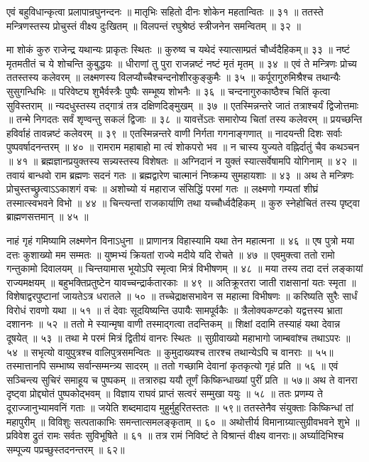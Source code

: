 एवं बहुविधान्कृत्वा प्रलापान्रघुनन्दनः ॥
मातृभिः सहितो दीनः शोकेन महतान्वितः ॥ ३१ ॥
ततस्ते मन्त्रिणस्तस्य प्रोचुस्तं वीक्ष्य दुःखितम् ॥
विलपन्तं रघुश्रेष्ठं स्त्रीजनेन समन्वितम् ॥ ३२ ॥

मा शोकं कुरु राजेन्द्र यथान्यः प्राकृतः स्थितः ॥
कुरुष्व च यथेदं स्यात्साम्प्रतं चौर्ध्वदैहिकम्॥ ३३ ॥
नष्टं मृतमतीतं च ये शोचन्ति कुबुद्धयः ॥
धीराणां तु पुरा राजन्नष्टं नष्टं मृतं मृतम् ॥ ३४ ॥
एवं ते मन्त्रिणः प्रोच्य ततस्तस्य कलेवरम् ॥
लक्ष्मणस्य विलप्यौच्चैश्चन्दनोशीरकुङ्कुमैः ॥ ३५ ॥
कर्पूरागुरुमिश्रैश्च तथान्यैः सुसुगन्धिभिः ॥
परिवेष्ट्य शुभैर्वस्त्रैः पुष्पैः सम्भूष्य शोभनैः ॥ ३६ ॥
चन्दनागुरुकाष्ठैश्च चितिं कृत्वा सुविस्तराम् ॥
न्यदधुस्तस्य तद्गात्रं तत्र दक्षिणदिङ्मुखम् ॥ ३७ ॥
एतस्मिन्नन्तरे जातं तत्राश्चर्यं द्विजोत्तमाः ॥
तन्मे निगदतः सर्वं शृण्वन्तु सकलं द्विजाः ॥ ३८ ॥
यावत्तेंऽतः समारोप्य चितां तस्य कलेवरम् ॥
प्रयच्छन्ति हविर्वाहं तावन्नष्टं कलेवरम् ॥ ३९ ॥
एतस्मिन्नन्तरे वाणी निर्गता गगनाङ्गणात् ॥
नादयन्ती दिशः सर्वाः पुष्पवर्षादनन्तरम् ॥ ४० ॥
रामराम महाबाहो मा त्वं शोकपरो भव ॥
न चास्य युज्यते वह्निर्दातुं चैव कथञ्चन ॥ ४१ ॥
ब्रह्मज्ञानप्रयुक्तस्य सन्न्यस्तस्य विशेषतः ॥
अग्निदानं न युक्तं स्यात्सर्वेषामपि योगिनाम् ॥ ४२ ॥
तवायं बान्धवो राम ब्रह्मणः सदनं गतः ॥
ब्रह्मद्वारेण चात्मानं निष्क्रम्य सुमहायशाः ॥ ४३ ॥
अथ ते मन्त्रिणः प्रोचुस्तच्छ्रुत्वाऽऽकाशगं वचः ॥
अशोच्यो यं महाराज संसिद्धिं परमां गतः ॥
लक्ष्मणो गम्यतां शीघ्रं तस्मात्स्वभवने विभो ॥ ४४ ॥
चिन्त्यन्तां राजकार्याणि तथा यच्चौर्ध्वदैहिकम् ॥
कुरु स्नेहोचितं तस्य पृष्ट्वा ब्राह्मणसत्तमान् ॥ ४५ ॥

नाहं गृहं गमिष्यामि लक्ष्मणेन विनाऽधुना ॥
प्राणानत्र विहास्यामि यथा तेन महात्मना ॥ ४६ ॥
एष पुत्रो मया दत्तः कुशाख्यो मम सम्मतः ॥
युष्मभ्यं क्रियतां राज्ये मदीये यदि रोचते ॥ ४७ ॥
एवमुक्त्वा ततो रामो गन्तुकामो दिवालयम् ॥
चिन्तयामास भूयोऽपि स्मृत्वा मित्रं विभीषणम् ॥ ४८ ॥
मया तस्य तदा दत्तं लङ्कायां राज्यमक्षयम् ॥
बहुभक्तिप्रतुष्टेन यावच्चन्द्रार्कतारकाः ॥ ४९ ॥
अतिक्रूरतरा जाती राक्षसानां यतः स्मृता ॥
विशेषाद्वरपुष्टानां जायतेऽत्र धरातले ॥ ५० ॥
तच्चेद्राक्षसभावेन स महात्मा विभीषणः ॥
करिष्यति सुरैः सार्धं विरोधं रावणो यथा ॥ ५१ ॥
तं देवाः सूदयिष्यन्ति उपायैः सामपूर्वकैः ॥
त्रैलोक्यकण्टको यद्वत्तस्य भ्राता दशाननः ॥ ५२ ॥
ततो मे स्यान्मृषा वाणी तस्माद्गत्वा तदन्तिकम् ॥
शिक्षां ददामि तस्याहं यथा देवान्न दूषयेत् ॥ ५३ ॥
तथा मे परमं मित्रं द्वितीयं वानरः स्थितः ॥
सुग्रीवाख्यो महाभागो जाम्बवांश्च तथाऽपरः ॥ ५४ ॥
सभृत्यो वायुपुत्रश्च वालिपुत्रसमन्वितः ॥
कुमुदाख्यश्च तारश्च तथान्येऽपि च वानराः ॥ ५५॥
तस्मात्तानपि सम्भाष्य सर्वान्सम्मन्त्र्य सादरम् ॥
ततो गच्छामि देवानां कृतकृत्यो गृहं प्रति ॥ ५६ ॥
एवं सञ्चिन्त्य सुचिरं समाहूय च पुष्पकम् ॥
तत्रारुह्य ययौ तूर्णं किष्किन्धाख्यां पुरीं प्रति ॥ ५७॥
अथ ते वानरा दृष्ट्वा प्रोद्द्योतं पुष्पकोद्भवम् ॥
विज्ञाय राघवं प्राप्तं सत्वरं सम्मुखा ययुः ॥ ५८ ॥
ततः प्रणम्य ते दूराज्जानुभ्यामवनिं गताः ॥
जयेति शब्दमादाय मुहुर्मुहुरितस्ततः ॥ ५९॥
ततस्तेनैव संयुक्ताः किष्किन्धां तां महापुरीम् ॥
विविशुः सत्पताकाभिः समन्तात्समलङ्कृताम् ॥ ६० ॥
अथोत्तीर्य विमानाग्र्यात्सुग्रीवभवने शुभे ॥
प्रविवेश द्रुतं रामः सर्वतः सुविभूषिते ॥ ६१ ॥
तत्र रामं निविष्टं ते विश्रान्तं वीक्ष्य वानराः॥
अर्घ्यादिभिश्च सम्पूज्य पप्रच्छुस्तदनन्तरम् ॥ ६२॥

